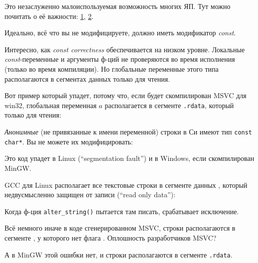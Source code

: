 \label{const_in_rdata}

Это незаслуженно малоиспользуемая возможность многих ЯП.
Тут можно почитать о её важности:
\href{https://isocpp.org/wiki/faq/const-correctness}{1},
\href{https://stackoverflow.com/questions/136880/sell-me-on-const-correctness}{2}.

Идеально, всё что вы не модифицируете, должно иметь модификатор \emph{const}.

Интересно, как \emph{const correctness} обеспечивается на низком уровне.
Локальные \emph{const}-переменные и аргументы ф-ций не проверяются во время исполнения (только во время компиляции).
Но глобальные переменные этого типа располагаются в сегментах данных только для чтения.

Вот пример который упадет, потому что, если будет скомпилирован MSVC для win32, глобальная переменная $a$ располагается
в сегменте \verb|.rdata|, который только для чтения:



\emph{Анонимные} (не привязанные к имени переменной) строки в Си имеют тип \verb|const char*|.
Вы не можете их модифицировать:



Это код упадет в Linux (``segmentation fault'') и в Windows, если скомпилирован MinGW.

GCC для Linux располагает все текстовые строки в сегменте данных , который недвусмысленно защищен от записи
(``read only data''):



Когда ф-ция \verb|alter_string()| пытается там писать, срабатывает исключение.

Всё немного иначе в коде сгенерированном MSVC, строки располагаются в сегменте , у которого нет флага .
Оплошность разработчиков MSVC?



А в MinGW этой ошибки нет, и строки располагаются в сегменте \verb|.rdata|.



